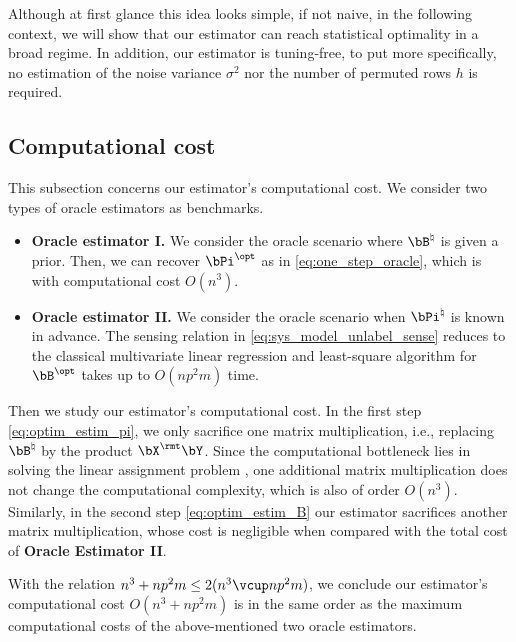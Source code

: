 \documentclass[11pt]{article}
\def \bPitrue {\bPi^{\natural}}
\def \bBtrue {\bB^{\natural}}
\def \bPiopt {\bPi^{\opt}}
\def \bBopt {\bB^{\opt}}
\begin{document}
Although at first glance this idea looks simple, if not naive,
in the following context, we will show that our estimator can reach statistical optimality in a broad regime.
In addition, our estimator is tuning-free, to put more specifically, no estimation of the noise variance $\sigma^2$ nor the number of permuted rows $h$ is required.

\subsection{Computational cost}
This subsection concerns our estimator's computational cost.
We consider two types of oracle estimators as benchmarks.
\begin{itemize}
\item
\textbf{Oracle estimator I.}
We consider the oracle scenario where $\bBtrue$ is given a prior.
Then, we can recover $\bPiopt$ as in \eqref{eq:one_step_oracle},
which is with computational cost $O(n^3)$.

\item
\textbf{Oracle estimator II.}	
We consider the oracle scenario when $\bPitrue$ is known in advance.
The sensing relation in \eqref{eq:sys_model_unlabel_sense}
reduces to the classical multivariate linear regression
and least-square algorithm for $\bBopt$
takes up to $O(np^2m)$ time.	
\end{itemize}

Then we study our estimator's computational
cost. In the first step \eqref{eq:optim_estim_pi}, we only sacrifice one matrix multiplication, i.e.,
replacing $\bBtrue$ by the product $\bX^{\rmt}\bY$.
Since the computational bottleneck
lies in solving the linear assignment problem
\citep{kuhn1955hungarian, bertsekas1992forward},
one additional matrix multiplication does not
change the computational complexity, which is
also of order $O(n^3)$.
Similarly, in the second step
\eqref{eq:optim_estim_B} our estimator sacrifices another
matrix multiplication, whose cost
is negligible when compared
with the total cost of \textbf{Oracle Estimator II}.

With the relation
$n^3 + np^2 m\leq 2(n^3 \vcup np^2m)$, we conclude our estimator's computational
cost $O(n^3 + np^2m)$ is in the same order as the maximum computational costs of the above-mentioned two oracle estimators.
\end{document}
